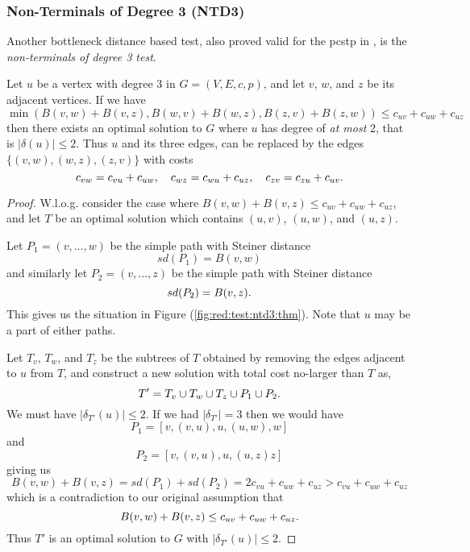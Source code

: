 \subsubsection{Non-Terminals of Degree 3 (NTD3)}
\label{sec:red:test:deg3}
Another bottleneck distance based test,
also proved valid for the \gls{pcstp} in \cite{uchoa2006reduction},
is the \textit{non-terminals of degree 3 test}.
\begin{theorem}\label{thm:ntd3}
  Let $u$ be a vertex with degree 3 in $G = (V, E, c, p)$,
  and let $v$, $w$, and $z$ be its adjacent
  vertices. If we have
  $$\min\left(B(v,w) + B(v,z), B(w,v) + B(w,z),  B(z, v)+ B(z, w)\right) \leq
  c_{uv} + c_{uw} + c_{uz}$$
  then there exists an optimal solution to $G$ where $u$ has degree of
  \textit{at most} 2, that is $|\delta(u)| \leq 2$. Thus $u$ and its three edges, can be replaced by
  the edges $\{(v, w), (w,z), (z,v)\}$ with costs
  $$c_{vw} = c_{vu} + c_{uw},\quad c_{wz} = c_{wu} + c_{uz},\quad c_{zv} = c_{zu} + c_{uv}\mathnormal{.}$$
\end{theorem}
\begin{proof}   
  W.l.o.g. consider the case where $B(v,w) + B(v,z) \leq c_{uv} + c_{uw} + c_{uz}$,
  and let $T$ be an optimal solution which contains $(u,v)$, $(u,w)$, and $(u,z)$.

  Let $P_1 = (v, ..., w)$ be the simple path with Steiner distance
  $$sd(P_1) = B(v,w)$$
  and similarly let $P_2 = (v, ..., z)$ be the simple path with Steiner distance
  $$sd(P_2) = B(v,z)\mathnormal{.}$$
  This gives us the situation in Figure (\ref{fig:red:test:ntd3:thm}). Note that $u$ may be a part of either paths.

  Let $T_v$, $T_w$, and $T_z$ be the subtrees of $T$ obtained by
  removing the edges adjacent to $u$ from $T$, and construct a new solution with
   total cost no-larger than $T$ as,
   $$T' = T_v \cup T_w \cup T_z \cup P_1 \cup P_2\mathnormal{.}$$
   We must have $|\delta_{T'}(u)| \leq 2$. If we had $|\delta_{T'}| = 3$ then
   we would have
   $$P_1 = \left[v, (v,u), u, (u,w), w \right]$$
   and
   $$P_2 = \left[v, (v,u), u, (u,z) z \right]$$
   giving us
   $$B(v,w) + B(v, z) = sd(P_1) + sd(P_2) = 2 c_{vu} + c_{uw} + c_{uz} > c_{vu} + c_{uw} + c_{uz}$$
   which is a contradiction to our original assumption that
   $$B(v,w) + B(v,z) \leq c_{uv} + c_{uw} + c_{uz}\mathnormal{.}$$
   Thus $T'$ is an optimal solution to $G$ with $|\delta_{T'}(u)| \leq 2$.
\end{proof}

